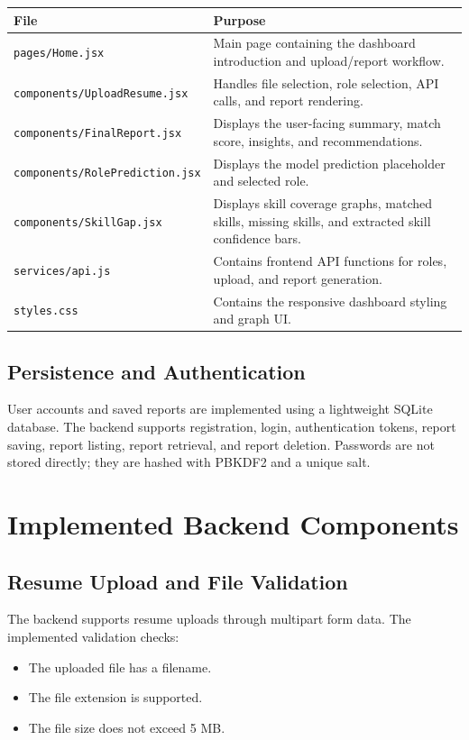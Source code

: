 \documentclass[12pt,a4paper]{article}
\begin{document}
\begin{longtable}{p{} p{}}
\toprule
\textbf{File} & \textbf{Purpose} \\
\midrule
\texttt{pages/Home.jsx} & Main page containing the dashboard introduction and upload/report workflow. \\
\texttt{components/UploadResume.jsx} & Handles file selection, role selection, API calls, and report rendering. \\
\texttt{components/FinalReport.jsx} & Displays the user-facing summary, match score, insights, and recommendations. \\
\texttt{components/RolePrediction.jsx} & Displays the model prediction placeholder and selected role. \\
\texttt{components/SkillGap.jsx} & Displays skill coverage graphs, matched skills, missing skills, and extracted skill confidence bars. \\
\texttt{services/api.js} & Contains frontend API functions for roles, upload, and report generation. \\
\texttt{styles.css} & Contains the responsive dashboard styling and graph UI. \\
\bottomrule
\end{longtable}

\subsection{Persistence and Authentication}

User accounts and saved reports are implemented using a lightweight SQLite database. The backend supports registration, login, authentication tokens, report saving, report listing, report retrieval, and report deletion. Passwords are not stored directly; they are hashed with PBKDF2 and a unique salt.

\section{Implemented Backend Components}

\subsection{Resume Upload and File Validation}

The backend supports resume uploads through multipart form data. The implemented validation checks:

\begin{itemize}
    \item The uploaded file has a filename.
    \item The file extension is supported.
    \item The file size does not exceed 5 MB.
\end{itemize}
\end{document}
